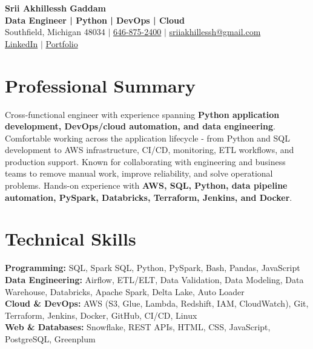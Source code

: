 \documentclass[letterpaper,10pt]{article}
\begin{document}
\fontsize{9.35pt}{10.45pt}\selectfont

\begin{center}
    {\LARGE \textbf{Srii Akhillessh Gaddam}} \\[-1pt]
    \textbf{Data Engineer | Python | DevOps | Cloud} \\[2pt]
    Southfield, Michigan 48034 $|$
    \href{tel:6468752400}{646-875-2400} $|$
    \href{mailto:sriiakhillessh@gmail.com}{sriiakhillessh@gmail.com} \\[1pt]
    \href{https://www.linkedin.com/in/srii-akhiilessh-gaddam-b48668191/}{LinkedIn} $|$
    \href{https://sriiakhillesshg.github.io/portfolio/}{Portfolio}
\end{center}
\vspace{-8pt}

\section{Professional Summary}
\small{Cross-functional engineer with experience spanning \textbf{Python application development, DevOps/cloud automation, and data engineering}. Comfortable working across the application lifecycle - from Python and SQL development to AWS infrastructure, CI/CD, monitoring, ETL workflows, and production support. Known for collaborating with engineering and business teams to remove manual work, improve reliability, and solve operational problems. Hands-on experience with \textbf{AWS, SQL, Python, data pipeline automation, PySpark, Databricks, Terraform, Jenkins, and Docker}.}

\section{Technical Skills}
\small{
\textbf{Programming:} SQL, Spark SQL, Python, PySpark, Bash, Pandas, JavaScript \\
\textbf{Data Engineering:} Airflow, ETL/ELT, Data Validation, Data Modeling, Data Warehouse, Databricks, Apache Spark, Delta Lake, Auto Loader \\
\textbf{Cloud \& DevOps:} AWS (S3, Glue, Lambda, Redshift, IAM, CloudWatch), Git, Terraform, Jenkins, Docker, GitHub, CI/CD, Linux \\
\textbf{Web \& Databases:} Snowflake, REST APIs, HTML, CSS, JavaScript, PostgreSQL, Greenplum
}
\end{document}
